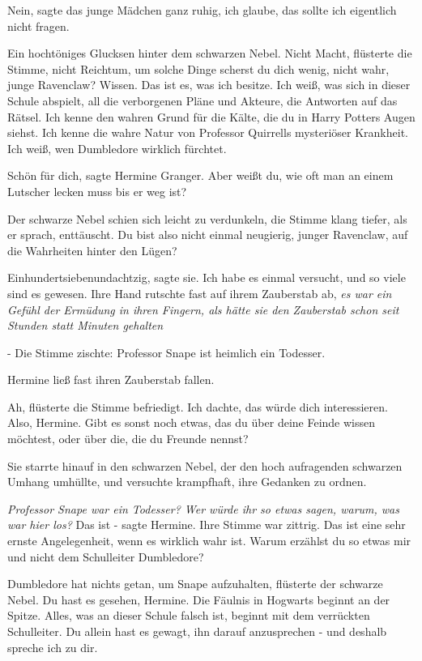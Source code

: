 \glqq{}Nein\grqq{}, sagte das junge Mädchen ganz ruhig, \glqq{}ich glaube, das
sollte ich eigentlich nicht fragen.\grqq{}

Ein hochtöniges Glucksen hinter dem schwarzen Nebel. \glqq{}Nicht Macht\grqq{},
flüsterte die Stimme, \glqq{}nicht Reichtum, um solche Dinge scherst du dich
wenig, nicht wahr, junge Ravenclaw? Wissen. Das ist es, was ich besitze. Ich
weiß, was sich in dieser Schule abspielt, all die verborgenen Pläne und Akteure,
die Antworten auf das Rätsel. Ich kenne den wahren Grund für die Kälte, die du
in Harry Potters Augen siehst. Ich kenne die wahre Natur von Professor Quirrells
mysteriöser Krankheit. Ich weiß, wen Dumbledore wirklich fürchtet.\grqq{}

\glqq{}Schön für dich\grqq{}, sagte Hermine Granger. \glqq{}Aber weißt du, wie oft
man an einem Lutscher lecken muss bis er weg ist?\grqq{}

Der schwarze Nebel schien sich leicht zu verdunkeln, die Stimme klang tiefer,
als er sprach, enttäuscht. \glqq{}Du bist also nicht einmal neugierig, junger
Ravenclaw, auf die Wahrheiten hinter den Lügen?\grqq{}

\glqq{}Einhundertsiebenundachtzig\grqq{}, sagte sie. \glqq{}Ich habe es einmal
versucht, und so viele sind es gewesen.\grqq{} Ihre Hand rutschte fast auf ihrem
Zauberstab ab, \emph{es war ein Gefühl der Ermüdung in ihren Fingern, als hätte
sie den Zauberstab schon seit Stunden statt Minuten gehalten}

- Die Stimme zischte: \glqq{}Professor Snape ist heimlich ein Todesser.\grqq{}

Hermine ließ fast ihren Zauberstab fallen.

\glqq{}Ah\grqq{}, flüsterte die Stimme befriedigt. \glqq{}Ich dachte, das würde
dich interessieren. Also, Hermine. Gibt es sonst noch etwas, das du über deine
Feinde wissen möchtest, oder über die, die du Freunde nennst?\grqq{}

Sie starrte hinauf in den schwarzen Nebel, der den hoch aufragenden schwarzen
Umhang umhüllte, und versuchte krampfhaft, ihre Gedanken zu ordnen.

\emph{Professor Snape war ein Todesser? Wer würde ihr so etwas sagen, warum, was
war hier los?} \glqq{}Das ist -\grqq{} sagte Hermine. Ihre Stimme war zittrig.
\glqq{}Das ist eine sehr ernste Angelegenheit, wenn es wirklich wahr ist. Warum
erzählst du so etwas mir und nicht dem Schulleiter Dumbledore?\grqq{}

\glqq{}Dumbledore hat nichts getan, um Snape aufzuhalten\grqq{}, flüsterte der
schwarze Nebel. \glqq{}Du hast es gesehen, Hermine. Die Fäulnis in Hogwarts
beginnt an der Spitze. Alles, was an dieser Schule falsch ist, beginnt mit dem
verrückten Schulleiter. Du allein hast es gewagt, ihn darauf anzusprechen - und
deshalb spreche ich zu dir.\grqq{}

